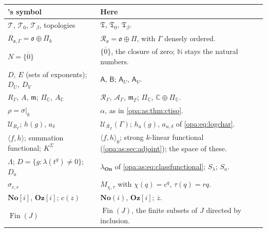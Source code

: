 \documentclass[11pt,oneside]{article}
\numberwithin{equation}{section}
\theoremstyle{definition}
\theoremstyle{remark}
\newcommand{\No}{\mathbf{No}}
\newcommand{\Oz}{\mathbf{Oz}}
\newcommand{\Og}{\mathbf{Oz}[i]}
\newcommand{\SC}{\mathbf{No}(i)}
\newcommand{\C}{\mathbb C}
\newcommand{\Z}{\mathbb Z}
\newcommand{\N}{\mathbb N}
\newcommand{\oo}{\mathfrak o}
\newcommand{\Ro}{\mathcal R_{\oo}}
\newcommand{\mm}{\mathfrak m}
\newcommand{\UU}{\mathcal U}
\newcommand{\pairing}[2]{\langle #1,#2\rangle_0}
\newcommand{\On}{\mathbf{On}}
\begin{document}
\begin{center}
\renewcommand{\arraystretch}{1.15}
\begin{longtable}{>{\raggedright\arraybackslash}p{}>{\raggedright\arraybackslash}p{}}
\toprule
15's symbol & Here\\
\midrule
\endhead
$\mathcal T$, $\mathcal T_0$, $\mathcal T_\beta$, topologies & $\mathfrak T$, $\mathfrak T_0$,
$\mathfrak T_\beta$.\\
$R_{\mathfrak o,\Gamma}=\mathfrak o\oplus\Pi_k$ & $\Ro=\oo\oplus\Pi$, with $\Gamma$ densely ordered.\\
$N=\overline{\{0\}}$ & $\overline{\{0\}}$, the closure of zero; $\N$ stays the natural numbers.\\
$D$, $E$ (sets of exponents); $D_U$, $D_V$ & $\mathsf A$, $\mathsf B$; $\mathsf A_U$, $\mathsf A_V$.\\
$R_\Gamma$, $A$, $\mm$; $\Pi_\C$, $A_\C$ & $\mathcal R_\Gamma$, $\mathcal A_\Gamma$, $\mm_\Gamma$; $\Pi_\C$,
$\C\oplus\Pi_\C$.\\
$\rho=\sigma|_k$ & $\alpha$, as in \cref{opa:as:thm:ctiso}.\\
$\mathcal U_{R_\Gamma}$; $h(g)$, $a_\delta$ & $\UU_{\mathcal R_\Z}(\Gamma)$; $h_u(g)$, $a_{u,\delta}$ of
\eqref{opa:eq:logchar}.\\
$\langle f,h\rangle$; summation functional; $K^\Sigma$ & $\pairing fh$; strong $k$-linear functional
(\cref{opa:as:sec:adjoint}); the space of these.\\
$\Lambda$; $D=\{g:\lambda(t^g)\ne0\}$; $D_a$ & $\lambda_{\On}$ of \eqref{opa:as:eq:classfunctional};
$S_\lambda$; $S_a$.\\
$\sigma_{c,r}$ & $M_{\chi,\tau}$ with $\chi(q)=c^q$, $\tau(q)=rq$.\\
$\No[i]$, $\Oz[i]$; $c(z)$ & $\SC$, $\Og$; $\overline z$.\\
$\operatorname{Fin}(J)$ & $\operatorname{Fin}(J)$, the finite subsets of $J$ directed by inclusion.\\
\bottomrule
\end{longtable}
\end{center}
\end{document}
